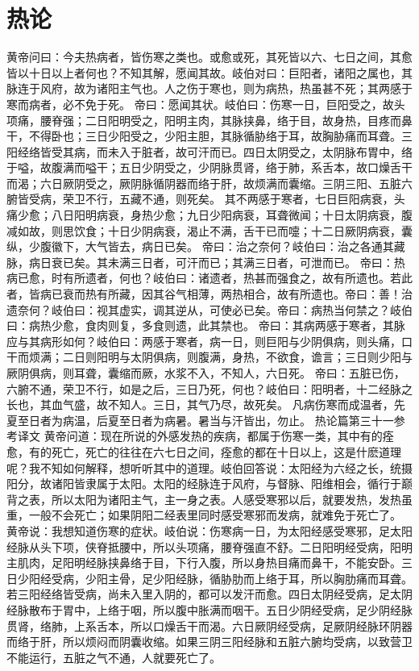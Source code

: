 \documentclass[a4paper,12pt,UTF8,twoside]{ctexbook}
\begin{document}
\chapter{热论}
黄帝问曰：今夫热病者，皆伤寒之类也。或愈或死，其死皆以六、七日之间，其愈皆以十日以上者何也？不知其解，愿闻其故。岐伯对曰：巨阳者，诸阳之属也，其脉连于风府，故为诸阳主气也。人之伤于寒也，则为病热，热虽甚不死；其两感于寒而病者，必不免于死。
帝曰：愿闻其状。岐伯曰：伤寒一日，巨阳受之，故头项痛，腰脊强；二日阳明受之，阳明主肉，其脉挟鼻，络于目，故身热，目疼而鼻干，不得卧也；三日少阳受之，少阳主胆，其脉循胁络于耳，故胸胁痛而耳聋。三阳经络皆受其病，而未入于脏者，故可汗而已。四日太阴受之，太阴脉布胃中，络于嗌，故腹满而嗌干；五日少阴受之，少阴脉贯肾，络于肺，系舌本，故口燥舌干而渴；六日厥阴受之，厥阴脉循阴器而络于肝，故烦满而囊缩。三阴三阳、五脏六腑皆受病，荣卫不行，五藏不通，则死矣。
其不两感于寒者，七日巨阳病衰，头痛少愈；八日阳明病衰，身热少愈；九日少阳病衰，耳聋微闻；十日太阴病衰，腹减如故，则思饮食；十日少阴病衰，渴止不满，舌干已而嚏；十二日厥阴病衰，囊纵，少腹徽下，大气皆去，病日已矣。
帝曰：治之奈何？岐伯曰：治之各通其藏脉，病日衰已矣。其未满三日者，可汗而已；其满三日者，可泄而已。
帝曰：热病已愈，时有所遗者，何也？岐伯曰：诸遗者，热甚而强食之，故有所遗也。若此者，皆病已衰而热有所藏，因其谷气相薄，两热相合，故有所遗也。帝曰：善！治遗奈何？岐伯曰：视其虚实，调其逆从，可使必已矣。帝曰：病热当何禁之？岐伯曰：病热少愈，食肉则复，多食则遗，此其禁也。
帝曰：其病两感于寒者，其脉应与其病形如何？岐伯曰：两感于寒者，病一日，则巨阳与少阴俱病，则头痛，口干而烦满；二日则阳明与太阴俱病，则腹满，身热，不欲食，谵言；三日则少阳与厥阴俱病，则耳聋，囊缩而厥，水浆不入，不知人，六日死。
帝曰：五脏已伤，六腑不通，荣卫不行，如是之后，三日乃死，何也？岐伯曰：阳明者，十二经脉之长也，其血气盛，故不知人。三日，其气乃尽，故死矣。
凡病伤寒而成温者，先夏至日者为病温，后夏至日者为病暑。暑当与汗皆出，勿止。
热论篇第三十一参考译文
黄帝问道：现在所说的外感发热的疾病，都属于伤寒一类，其中有的痊愈，有的死亡，死亡的往往在六七日之间，痊愈的都在十日以上，这是什麽道理呢？我不知如何解释，想听听其中的道理。岐伯回答说：太阳经为六经之长，统摄阳分，故诸阳皆隶属于太阳。太阳的经脉连于风府，与督脉、阳维相会，循行于巅背之表，所以太阳为诸阳主气，主一身之表。人感受寒邪以后，就要发热，发热虽重，一般不会死亡；如果阴阳二经表里同时感受寒邪而发病，就难免于死亡了。
黄帝说：我想知道伤寒的症状。岐伯说：伤寒病一日，为太阳经感受寒邪，足太阳经脉从头下项，侠脊抵腰中，所以头项痛，腰脊强直不舒。二日阳明经受病，阳明主肌肉，足阳明经脉挟鼻络于目，下行入腹，所以身热目痛而鼻干，不能安卧。三日少阳经受病，少阳主骨，足少阳经脉，循胁肋而上络于耳，所以胸肋痛而耳聋。若三阳经络皆受病，尚未入里入阴的，都可以发汗而愈。四日太阴经受病，足太阴经脉散布于胃中，上络于咽，所以腹中胀满而咽干。五日少阴经受病，足少阴经脉贯肾，络肺，上系舌本，所以口燥舌干而渴。六日厥阴经受病，足厥阴经脉环阴器而络于肝，所以烦闷而阴囊收缩。如果三阴三阳经脉和五脏六腑均受病，以致营卫不能运行，五脏之气不通，人就要死亡了。
\end{document}
